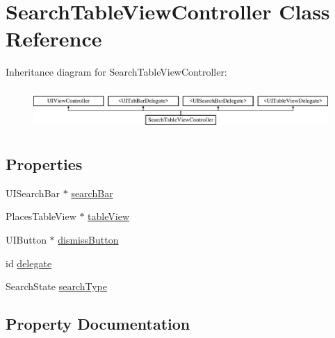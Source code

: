 \hypertarget{interface_search_table_view_controller}{}\section{Search\+Table\+View\+Controller Class Reference}
\label{interface_search_table_view_controller}
Inheritance diagram for Search\+Table\+View\+Controller\+:\begin{figure}[H]
\begin{center}
\leavevmode
\includegraphics[height=1.590909cm]{interface_search_table_view_controller}
\end{center}
\end{figure}
\subsection*{Properties}
\begin{DoxyCompactItemize}
\item 
U\+I\+Search\+Bar $\ast$ \hyperlink{interface_search_table_view_controller_a7c8d8568f851c6e9d91fc38117c7ba43}{search\+Bar}
\item 
Places\+Table\+View $\ast$ \hyperlink{interface_search_table_view_controller_a6d2cc18899642830d84cb48d791c179d}{table\+View}
\item 
U\+I\+Button $\ast$ \hyperlink{interface_search_table_view_controller_aa67b44900c4bf8b61e938f0260b5edea}{dismiss\+Button}
\item 
id \hyperlink{interface_search_table_view_controller_a135bcffaa0e477838a8b206fdcf7093d}{delegate}
\item 
Search\+State \hyperlink{interface_search_table_view_controller_aa8e7e53bbf700399f86b5852e0f6011b}{search\+Type}
\end{DoxyCompactItemize}


\subsection{Property Documentation}
